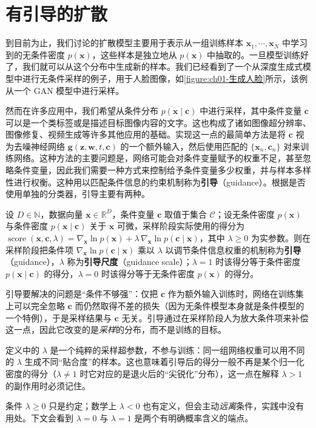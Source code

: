 \documentclass[../../main.tex]{subfiles}
\begin{document}
\section{有引导的扩散}\label{section:ch20-有引导的扩散}

到目前为止，我们讨论的扩散模型主要用于表示从一组训练样本 $\bm{x}_1,\cdots,\bm{x}_N$ 中学习到的无条件密度 $p(\bm{x})$，这些样本是独立地从 $p(\bm{x})$ 中抽取的。一旦模型训练好了，我们就可以从这个分布中生成新的样本。我们已经看到了一个从深度生成式模型中进行无条件采样的例子，用于人脸图像，如\cref{figure:ch01-生成人脸}所示，该例从一个 GAN 模型中进行采样。

然而在许多应用中，我们希望从条件分布 $p(\bm{x}\mid\bm{c})$ 中进行采样，其中条件变量 $\bm{c}$ 可以是一个类标签或是描述目标图像内容的文字。这也构成了诸如图像超分辨率、图像修复、视频生成等许多其他应用的基础。实现这一点的最简单方法是将 $\bm{c}$ 视为去噪神经网络 $\bm{g}(\bm{z},\bm{w},t,\bm{c})$ 的一个额外输入，然后使用匹配的 $\{\bm{x}_n,\bm{c}_n\}$ 对来训练网络。这种方法的主要问题是，网络可能会对条件变量赋予的权重不足，甚至忽略条件变量，因此我们需要一种方式来控制给予条件变量多少权重，并与样本多样性进行权衡。这种用以匹配条件信息的约束机制称为\textbf{引导}（guidance）。根据是否使用单独的分类器，引导主要有两种。

\begin{definition}[引导与引导尺度]\label{definition:ch20-引导}
设 $D\in\mathbb{N}$，数据向量 $\bm{x}\in\mathbb{R}^{D}$，条件变量 $\bm{c}$ 取值于集合 $\mathcal{C}$；设无条件密度 $p(\bm{x})$ 与条件密度 $p(\bm{x}\mid\bm{c})$ 关于 $\bm{x}$ 可微，采样阶段实际使用的得分为 $\operatorname{score}(\bm{x},\bm{c},\lambda)=\nabla_{\bm{x}}\ln p(\bm{x})+\lambda\,\nabla_{\bm{x}}\ln p(\bm{c}\mid\bm{x})$，其中 $\lambda\geqslant0$ 为实参数。则在采样阶段把条件项 $\nabla_{\bm{x}}\ln p(\bm{c}\mid\bm{x})$ 乘以 $\lambda$ 以调节条件信息权重的机制称为\textbf{引导}（guidance），$\lambda$ 称为\textbf{引导尺度}（guidance scale）；$\lambda=1$ 时该得分等于条件密度 $p(\bm{x}\mid\bm{c})$ 的得分，$\lambda=0$ 时该得分等于无条件密度 $p(\bm{x})$ 的得分。
\end{definition}

\begin{remark}
引导要解决的问题是“条件不够强”：仅把 $\bm{c}$ 作为额外输入训练时，网络在训练集上可以完全忽略 $\bm{c}$ 而仍然取得不差的损失（因为无条件模型本身就是条件模型的一个特例），于是采样结果与 $\bm{c}$ 无关。引导通过在采样阶段人为放大条件项来补偿这一点，因此它改变的是\emph{采样}的分布，而不是训练的目标。\par
定义中的 $\lambda$ 是一个纯粹的采样超参数，不参与训练：同一组网络权重可以用不同的 $\lambda$ 生成不同“贴合度”的样本。这也意味着引导后的得分一般不再是某个归一化密度的得分（$\lambda\neq1$ 时它对应的是退火后的“尖锐化”分布），这一点在解释 $\lambda>1$ 的副作用时必须记住。\par
条件 $\lambda\geqslant0$ 只是约定；数学上 $\lambda<0$ 也有定义，但会主动\emph{远离}条件，实践中没有用处。下文会看到 $\lambda=0$ 与 $\lambda=1$ 是两个有明确概率含义的端点。
\end{remark}
\end{document}
